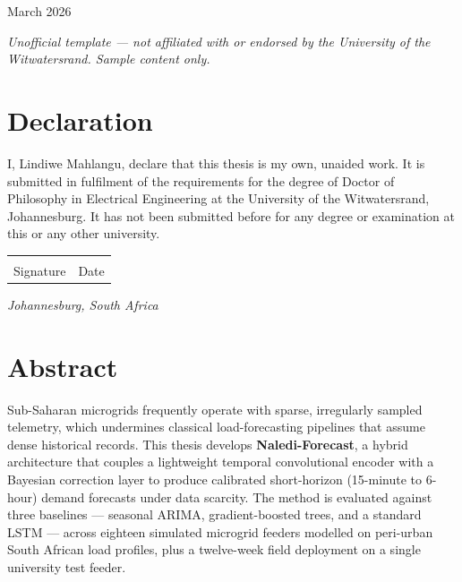\documentclass[12pt,a4paper]{report}
\begin{document}
\begin{titlepage}
\vspace{1.4cm}

{\large March 2026}

\vfill

\begin{center}
\begin{minipage}{0.82\linewidth}
\centering
\footnotesize\itshape\color{witsslate}
Unofficial template --- not affiliated with or endorsed by the University of the Witwatersrand.
Sample content only.
\end{minipage}
\end{center}

\vspace{1.6cm}

\end{titlepage}

\chapter*{Declaration}

I, Lindiwe Mahlangu, declare that this thesis is my own, unaided work. It is submitted in
fulfilment of the requirements for the degree of Doctor of Philosophy in Electrical
Engineering at the University of the Witwatersrand, Johannesburg. It has not been submitted
before for any degree or examination at this or any other university.

\vspace{1.6cm}
\begin{tabular}{@{}p{4.5cm}p{4.5cm}}
\dotfill & \dotfill \\
Signature & Date
\end{tabular}

\vspace{1cm}
\noindent\textit{Johannesburg, South Africa}

\chapter*{Abstract}

Sub-Saharan microgrids frequently operate with sparse, irregularly sampled telemetry, which
undermines classical load-forecasting pipelines that assume dense historical records. This
thesis develops \textbf{Naledi-Forecast}, a hybrid architecture that couples a lightweight
temporal convolutional encoder with a Bayesian correction layer to produce calibrated
short-horizon (15-minute to 6-hour) demand forecasts under data scarcity. The method is
evaluated against three baselines --- seasonal ARIMA, gradient-boosted trees, and a standard
LSTM --- across eighteen simulated microgrid feeders modelled on peri-urban South African
load profiles, plus a twelve-week field deployment on a single university test feeder.
\end{document}

